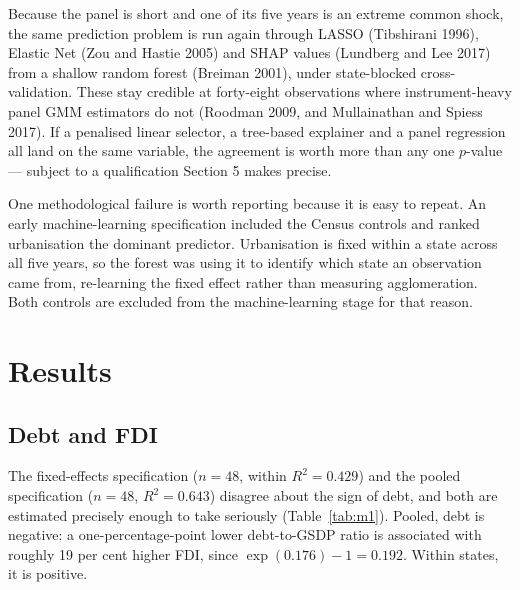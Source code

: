 \documentclass[12pt]{article}
\begin{document}
Because the panel is short and one of its five years is an extreme common shock,
the same prediction problem is run again through LASSO (Tibshirani 1996), Elastic
Net (Zou and Hastie 2005) and SHAP values (Lundberg and Lee 2017) from a shallow
random forest (Breiman 2001), under state-blocked cross-validation. These stay
credible at forty-eight observations where instrument-heavy panel GMM estimators
do not (Roodman 2009, and Mullainathan and Spiess 2017). If a penalised linear
selector, a tree-based explainer and a panel regression all land on the same
variable, the agreement is worth more than any one $p$-value --- subject to a
qualification Section 5 makes precise.

One methodological failure is worth reporting because it is easy to repeat. An
early machine-learning specification included the Census controls and ranked
urbanisation the dominant predictor. Urbanisation is fixed within a state across
all five years, so the forest was using it to identify which state an observation
came from, re-learning the fixed effect rather than measuring agglomeration. Both
controls are excluded from the machine-learning stage for that reason.

\section{Results}

\subsection{Debt and FDI}

The fixed-effects specification ($n=48$, within $R^2 = 0.429$) and the pooled
specification ($n=48$, $R^2 = 0.643$) disagree about the sign of debt, and both
are estimated precisely enough to take seriously (Table~\ref{tab:m1}). Pooled,
debt is negative: a one-percentage-point lower debt-to-GSDP ratio is associated
with roughly 19 per cent higher FDI, since $\exp(0.176) - 1 = 0.192$. Within
states, it is positive.
\end{document}
